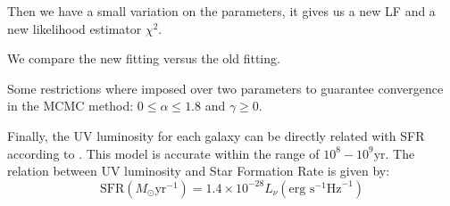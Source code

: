 Then we have a small variation on the parameters, it gives us a new LF and a new 
likelihood estimator $\chi^2$. 

We compare the new fitting versus the old fitting.



Some restrictions where imposed over two parameters to guarantee convergence in the 
MCMC method: $0 \leq \alpha \leq 1.8 $  and $\gamma \geq 0$.







Finally, the UV luminosity for each galaxy can be directly related with SFR according 
to \citet{madau98}.
This model is accurate within the range of $10^8 - 10^9 \textrm{yr}$\citep{kennicutt98}.
The relation between UV luminosity and Star Formation Rate \citep{madau98,kennicutt98} 
is given by:
\begin{equation}
 \textrm{SFR}\left(M_\odot \textrm{yr}^{-1}\right) 
      = 1.4 \times 10^{-28} L_{\nu} \left( \textrm{erg s}^{-1}\textrm{Hz}^{-1} 
	\right)
\end{equation}
